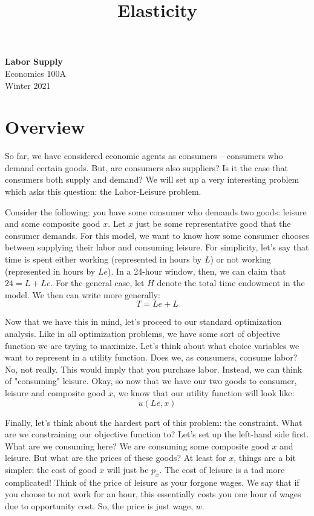 \documentclass[11pt]{article}
\theoremstyle{definition}
\begin{document}
	\setcounter{section}{0}
	\title{Elasticity}
	\graphicspath{ {./images/} } 
	\thispagestyle{empty}
	
	\begin{center}
		{\LARGE \bf Labor Supply}\\
		{\large Economics 100A}\\
		Winter 2021
	\end{center}
	\section{Overview}
	So far, we have considered economic agents as consumers -- consumers who demand certain goods. But, are consumers also suppliers? Is it the case that consumers both supply and demand? We will set up a very interesting problem which asks this question: the Labor-Leisure problem. 
	
	Consider the following: you have some consumer who demands two goods: leisure and some composite good $x$. Let $x$ just be some representative good that the consumer demands. For this model, we want to know how some consumer chooses between supplying their labor and consuming leisure. For simplicity, let's say that time is spent either working (represented in hours by $L$) or not working (represented in hours by $Le$). In a 24-hour window, then, we can claim that $24 = L + Le$. For the general case, let $H$ denote the total time endowment in the model. We then can write more generally:
	\[T = Le + L\]
	
	Now that we have this in mind, let's proceed to our standard optimization analysis. Like in all optimization problems, we have some sort of objective function we are trying to maximize. Let's think about what choice variables we want to represent in a utility function. Does we, as consumers, consume labor?  No, not really. This would imply that you purchase labor. Instead, we can think of "consuming" leisure. Okay, so now that we have our two goods to consumer, leisure and composite good $x$, we know that our utility function will look like:
	\[u(Le, x)\]
	
	Finally, let's think about the hardest part of this problem: the constraint. What are we constraining our objective function to? Let's set up the left-hand side first. What are we consuming here? We are consuming some composite good $x$ and leisure. But what are the prices of these goods? At least for $x$, things are a bit simpler: the cost of good $x$ will just be $p_x$. The cost of leisure is a tad more complicated! Think of the price of leisure as your forgone wages. We say that if you choose to not work for an hour, this essentially costs you one hour of wages due to opportunity cost. So, the price is just wage, $w$. 
	
\end{document}
